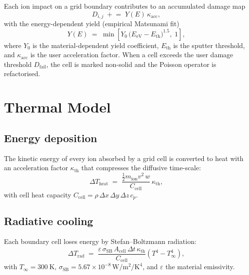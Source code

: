 \documentclass[11pt,a4paper]{article}
\begin{document}
Each ion impact on a grid boundary contributes to an accumulated
damage map
\begin{equation}
    D_{i,j} \;+\!=\; Y(E)\,\kappa_{\mathrm{acc}},
\end{equation}
with the energy-dependent yield (empirical Matsunami fit)
\begin{equation}
    Y(E) \;=\;
    \min\!\left[
    Y_{0}\,\bigl(E_{\mathrm{eV}}-E_{\mathrm{th}}\bigr)^{1.5},\;1
    \right],
\end{equation}
where \(Y_{0}\) is the material-dependent yield coefficient,
\(E_{\mathrm{th}}\) is the sputter threshold, and
\(\kappa_{\mathrm{acc}}\) is the user acceleration factor.
When a cell exceeds the user damage threshold
\(D_{\mathrm{fail}}\), the cell is marked non-solid and the
Poisson operator is refactorised.

\section{Thermal Model}

\subsection{Energy deposition}

The kinetic energy of every ion absorbed by a grid cell is
converted to heat with an acceleration factor
\(\kappa_{\mathrm{th}}\) that compresses the
diffusive time-scale:
\begin{equation}
    \Delta T_{\mathrm{heat}} \;=\;
    \frac{\tfrac{1}{2}m_{\mathrm{ion}} v^{2}\,w}{C_{\mathrm{cell}}}\,
    \kappa_{\mathrm{th}},
\end{equation}
with cell heat capacity
\(C_{\mathrm{cell}}=\rho\,\Delta x\,\Delta y\,\Delta z\,c_{p}\).

\subsection{Radiative cooling}

Each boundary cell loses energy by Stefan--Boltzmann radiation:
\begin{equation}
    \Delta T_{\mathrm{rad}} \;=\;
    \frac{\varepsilon\,\sigma_{\mathrm{SB}}\,A_{\mathrm{cell}}\,\Delta t\,
         \kappa_{\mathrm{th}}}{C_{\mathrm{cell}}}
    \left(T^{4}-T_{\infty}^{4}\right),
\end{equation}
with \(T_{\infty}=\SI{300}{\kelvin}\),
\(\sigma_{\mathrm{SB}}=5.67\times10^{-8}\,\si{\watt\per\meter\squared\per\kelvin\tothe{4}}\),
and \(\varepsilon\) the material emissivity.
\end{document}

